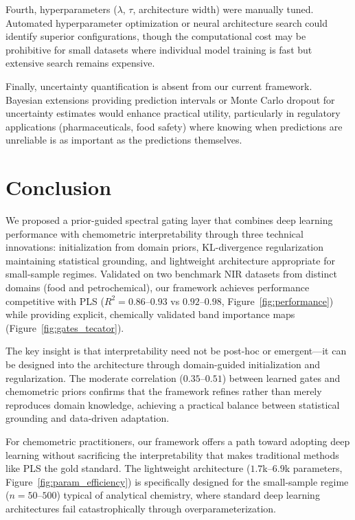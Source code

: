 \documentclass[preprint,12pt]{elsarticle}
\begin{document}
Fourth, hyperparameters ($\lambda$, $\tau$, architecture width) were manually tuned. Automated hyperparameter optimization or neural architecture search could identify superior configurations, though the computational cost may be prohibitive for small datasets where individual model training is fast but extensive search remains expensive.

Finally, uncertainty quantification is absent from our current framework. Bayesian extensions providing prediction intervals or Monte Carlo dropout for uncertainty estimates would enhance practical utility, particularly in regulatory applications (pharmaceuticals, food safety) where knowing when predictions are unreliable is as important as the predictions themselves.

\section{Conclusion}

We proposed a prior-guided spectral gating layer that combines deep learning performance with chemometric interpretability through three technical innovations: initialization from domain priors, KL-divergence regularization maintaining statistical grounding, and lightweight architecture appropriate for small-sample regimes. Validated on two benchmark NIR datasets from distinct domains (food and petrochemical), our framework achieves performance competitive with PLS ($R^2=0.86$--$0.93$ vs $0.92$--$0.98$, Figure~\ref{fig:performance}) while providing explicit, chemically validated band importance maps (Figure~\ref{fig:gates_tecator}).

The key insight is that interpretability need not be post-hoc or emergent---it can be designed into the architecture through domain-guided initialization and regularization. The moderate correlation ($0.35$--$0.51$) between learned gates and chemometric priors confirms that the framework refines rather than merely reproduces domain knowledge, achieving a practical balance between statistical grounding and data-driven adaptation.

For chemometric practitioners, our framework offers a path toward adopting deep learning without sacrificing the interpretability that makes traditional methods like PLS the gold standard. The lightweight architecture ($1.7$k--$6.9$k parameters, Figure~\ref{fig:param_efficiency}) is specifically designed for the small-sample regime ($n=50$--$500$) typical of analytical chemistry, where standard deep learning architectures fail catastrophically through overparameterization.
\end{document}
